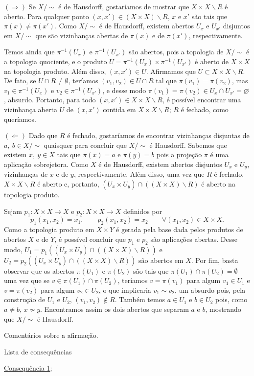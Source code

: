 \begin{dem}
    $(\Longrightarrow)$ Se $X/\sim$ é de Hausdorff, gostaríamos de mostrar que $X\times X\backslash R$ é aberto. Para qualquer ponto $(x,x')\in (X\times X)\backslash R$, $x$ e $x'$ são tais que $\pi(x)\neq \pi(x')$. Como $X/\sim$ é de Hausdorff, existem abertos $U_x$ e $U_{x'}$ disjuntos em $X/\sim$ que são vizinhanças abertas de $\pi(x)$ e de $\pi(x')$, respectivamente.%

    Temos ainda que $\pi^{-1}(U_x)$ e $\pi^{-1}(U_{x'})$ são abertos, pois a topologia de $X/\sim$ é a topologia quociente, e o produto $U=\pi^{-1}(U_x)\times \pi^{-1}(U_{x'})$ é aberto de $X\times X$ na topologia produto. Além disso, $(x,x')\in U$. Afirmamos que $U\subset X\times X\backslash R$. De fato, se $U\cap R\neq \emptyset$, teríamos $(v_1,v_2)\in U\cap R$ tal que $\pi(v_1)=\pi(v_2)$, mas $v_1 \in \pi^{-1}(U_x)$ e $v_2\in \pi^{-1}(U_{x'})$, e desse modo $\pi(v_1) = \pi(v_2) \in U_x \cap U_{x'} = \varnothing$, absurdo. Portanto, para todo $(x,x')\in X\times X\backslash R$, é possível encontrar uma vizinhança aberta $U$ de $(x,x')$ contida em $X\times X\backslash R$; $R$ é fechado, como queríamos.\newline

    $(\Longleftarrow)$ Dado que $R$ é fechado, gostaríamos de encontrar vizinhanças disjuntas de $a,~b\in X/\sim$ quaisquer para concluir que $X/\sim$ é Hausdorff. Sabemos que existem $x,~y\in X$ tais que $\pi(x)=a$ e $\pi(y)=b$ pois a projeção $\pi$ é uma aplicação sobrejetora. Como $X$ é de Hausdorff, existem abertos disjuntos $U_x$ e $U_y$, vizinhanças de $x$ e de $y$, respectivamente. Além disso, uma vez que $R$ é fechado, $X\times X\backslash R$ é aberto e, portanto, $(U_x\times U_y)\cap((X\times X)\backslash R)$ é aberto na topologia produto.

    Sejam $p_1:X\times X\rightarrow X$ e $p_2:X\times X\rightarrow X$ definidos por $$p_1(x_1,x_2)=x_1,\qquad p_2(x_1,x_2)=x_2 \qquad\forall (x_1,x_2)\in X\times X.$$ Como a topologia produto em $X\times Y$ é gerada pela base dada pelos produtos de abertos $X$ e de $Y$, é possível concluir que $p_1$ e $p_2$ são aplicações abertas. Desse modo, $U_1=p_1((U_x\times U_y)\cap((X\times X)\backslash R))$ e $U_2=p_2((U_x\times U_y)\cap((X\times X)\backslash R))$ são abertos em $X$. Por fim, basta observar que os abertos $\pi(U_1)$ e $\pi(U_2)$ são tais que $\pi(U_1)\cap \pi(U_2)=\emptyset$ uma vez que se $v\in \pi(U_1)\cap\pi(U_2)$, teríamos $v=\pi(v_1)$ para algum $v_1\in U_1$ e $v=\pi(v_2)$ para algum $v_2\in U_2$, o que implicaria $v_1\sim v_2$, um absurdo pois, pela construção de $U_1$ e $U_2$, $(v_1,v_2)\not\in R$.  Também temos $a\in U_1$ e $b\in U_2$ pois, como $a\neq b$, $x\not\sim y$. Encontramos assim os dois abertos que separam $a$ e $b$, mostrando que $X/\sim$ é Hausdorff.
\end{dem}

Comentários sobre a afirmação.

\begin{titlemize}{Lista de consequências}
	\item \hyperref[consequencia1]{Consequência 1};\\ %
\end{titlemize}

